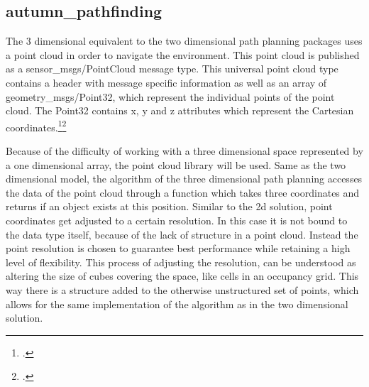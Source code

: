 \subsection{autumn\_pathfinding}
The 3 dimensional equivalent to the two dimensional path planning packages uses a point cloud in order to navigate the environment. This point cloud is published as a \linebreak sensor\_msgs/PointCloud message type. This universal point cloud type contains a header with message specific information as well as an array of geometry\_msgs/Point32, which represent the individual points of the point cloud. The Point32 contains x, y and z attributes which represent the Cartesian coordinates.\footcite{rosGeometryMsgsPoint322021}\footcite{rosSensorMsgsPointCloud2021}

Because of the difficulty of working with a three dimensional space represented by a one dimensional array, the point cloud library will be used. Same as the two dimensional model, the algorithm of the three dimensional path planning accesses the data of the point cloud through a function which takes three coordinates and returns if an object exists at this position.\newline
Similar to the 2d solution, point coordinates get adjusted to a certain resolution. In this case it is not bound to the data type itself, because of the lack of structure in a point cloud. Instead the point resolution is chosen to guarantee best performance while retaining a high level of flexibility. This process of adjusting the resolution, can be understood as altering the size of cubes covering the space, like cells in an occupancy grid. This way there is a structure added to the otherwise unstructured set of points, which allows for the same implementation of the algorithm as in the two dimensional solution. 

